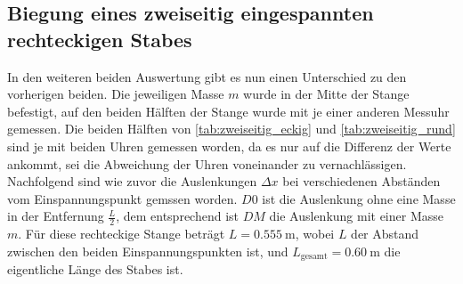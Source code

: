 \subsection{Biegung eines zweiseitig eingespannten rechteckigen Stabes}
\label{sec:Biegung eines zweiseitig eingespannten rechteckigen Stabes}

In den weiteren beiden Auswertung gibt es nun einen Unterschied zu den vorherigen beiden. Die jeweiligen Masse $m$ wurde in der Mitte der Stange befestigt, auf den beiden Hälften der Stange wurde mit je einer anderen Messuhr gemessen. Die beiden Hälften von \autoref{tab:zweiseitig_eckig} und \autoref{tab:zweiseitig_rund} sind je mit beiden Uhren gemessen worden, da es nur auf die Differenz der Werte ankommt, sei die Abweichung der Uhren voneinander zu vernachlässigen. Nachfolgend sind wie zuvor die Auslenkungen $\Delta x$ bei verschiedenen Abständen vom Einspannungspunkt gemssen worden. $D0$ ist die Auslenkung ohne eine Masse in der Entfernung $\frac{L}{2}$, dem entsprechend ist $DM$ die Auslenkung mit einer Masse $m$. Für diese rechteckige Stange beträgt $L = \SI{0.555}{\meter}$, wobei $L$ der Abstand zwischen den beiden Einspannungspunkten ist, und $L_\text{gesamt} = \SI{0.60}{\meter}$ die eigentliche Länge des Stabes ist.

